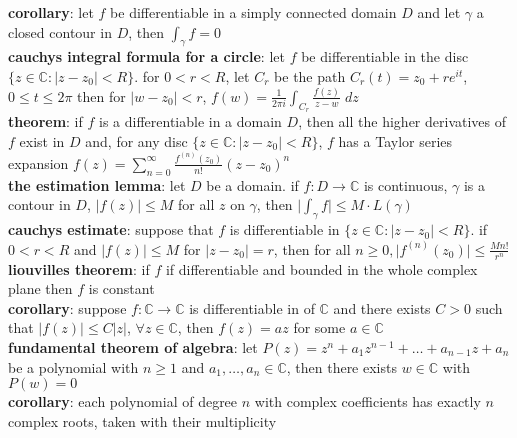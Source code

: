 \documentclass[a4paper]{article}
\newcommand*\abs[1]{\vert #1 \vert}
\begin{document}
\begin{framed}
	\noindent
	\textbf{corollary}: let $f$ be differentiable in a simply connected domain $D$ and let $\gamma$ a closed contour in $D$, then $\int_\gamma f = 0$\\
	
	\noindent
	\textbf{cauchys integral formula for a circle}: let $f$ be differentiable in the disc $\{ z \in \mathbb{C} : \abs{z - z_0} < R \}$. for $0 < r < R$, let $C_r$ be the path $C_r(t) = z_0 + re^{it}$, $0 \leq t \leq 2\pi$ then for $\abs{w - z_0} < r$, $f(w) = \frac{1}{2\pi i} \int_{C_r} \frac{f(z)}{z - w} \; dz$\\
	
	\noindent
	\textbf{theorem}: if $f$ is a differentiable in a domain $D$, then all the higher derivatives of $f$ exist in $D$ and, for any disc $\{ z \in \mathbb{C} : \abs{z - z_0} < R \}$, $f$ has a Taylor series expansion $f(z) = \sum_{n=0}^\infty \frac{f^{(n)}(z_0)}{n!}(z - z_0)^n$\\
	
	\noindent
	\textbf{the estimation lemma}: let $D$ be a domain. if $f: D \rightarrow \mathbb{C}$ is continuous, $\gamma$ is a contour in $D$, $\abs{f(z)} \leq M$ for all $z$ on $\gamma$, then $\abs{\int_\gamma f} \leq M \cdot L(\gamma)$\\
	
	\noindent
	\textbf{cauchys estimate}: suppose that $f$ is differentiable in $\{ z \in \mathbb{C} : \abs{z - z_0} < R \}$. if $0 < r < R$ and $\abs{f(z)} \leq M$ for $\abs{z - z_0} = r$, then for all $n \geq 0, \abs{f^{(n)}(z_0)} \leq \frac{Mn!}{r^n}$\\
	
	\noindent
	\textbf{liouvilles theorem}: if $f$ if differentiable and bounded in the whole complex plane then $f$ is constant\\
	
	\noindent
	\textbf{corollary}: suppose $f: \mathbb{C} \rightarrow \mathbb{C}$ is differentiable in of $\mathbb{C}$ and there exists $C > 0$ such that $\abs{f(z)} \leq C \abs{z}$, $\forall z \in \mathbb{C}$, then $f(z) = az$ for some $a \in \mathbb{C}$\\
	
	\noindent
	\textbf{fundamental theorem of algebra}: let $P(z) = z^n + a_1z^{n-1} + \dots + a_{n-1}z + a_n$ be a polynomial with $n \geq 1$ and $a_1, \dots, a_n \in \mathbb{C}$, then there exists $w \in \mathbb{C}$ with $P(w) = 0$\\
	
	\noindent
	\textbf{corollary}: each polynomial of degree $n$ with complex coefficients has exactly $n$ complex roots, taken with their multiplicity
\end{framed}
\end{document}
